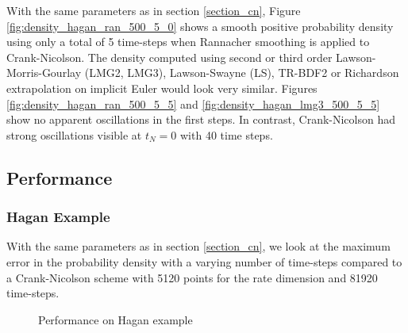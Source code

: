 \documentclass[]{rAMF2e}
\begin{document}
With the same parameters as in section \ref{section_cn}, Figure \ref{fig:density_hagan_ran_500_5_0} shows a smooth positive probability density using only a total of 5 time-steps when Rannacher smoothing is applied to Crank-Nicolson. The density computed using second or third order Lawson-Morris-Gourlay (LMG2, LMG3), Lawson-Swayne (LS), TR-BDF2 or Richardson extrapolation on implicit Euler would look very similar. Figures \ref{fig:density_hagan_ran_500_5_5} and \ref{fig:density_hagan_lmg3_500_5_5} show no apparent oscillations in the first steps.
In contrast, Crank-Nicolson had strong oscillations visible at $t_N=0$ with 40 time steps.

\subsection{Performance}
\subsubsection{Hagan Example}
With the same parameters as in section \ref{section_cn}, we look at the maximum error in the probability density with a varying number of time-steps compared to a Crank-Nicolson scheme with 5120 points for the rate dimension and 81920 time-steps. 

\begin{figure}[htb]
  \begin{center}  
    \end{center}
     \caption{\label{fig:perf_hagan_500} Performance on Hagan example}
\end{figure}
\end{document}
